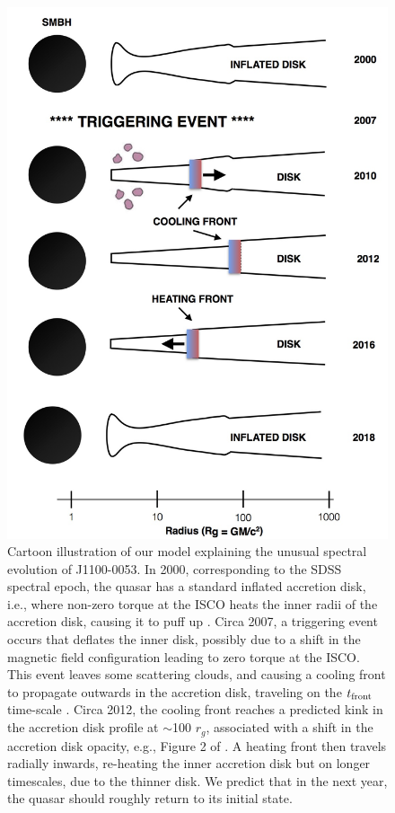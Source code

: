 \documentclass[a4paper,fleqn,usenatbib]{mnras}
\begin{document}
\begin{figure}
  \includegraphics[width=15.4cm, trim=0.0cm 0.0cm 0.0cm 0.0cm, clip]
  {../plots/models/cartoon_v3pnt1.jpg}
  \centering
  \caption[]{
    Cartoon illustration of our model explaining the unusual spectral
evolution of J1100-0053. In 2000, corresponding to the SDSS spectral
epoch, the quasar has a standard inflated accretion disk, i.e., where
non-zero torque at the ISCO heats the inner radii of the accretion
disk, causing it to puff up \citep[e.g.,][]{Zimmerman2005}. Circa
2007, a triggering event occurs that deflates the inner disk, possibly
due to a shift in the magnetic field configuration leading to zero
torque at the ISCO.  This event leaves some scattering clouds, and
causing a cooling front to propagate outwards in the accretion disk,
traveling on the $t_{\rm front}$ time-scale 
\citep[see also][]{Hameury2009}. 
 Circa 2012, the cooling
front reaches a predicted kink in the accretion disk profile at
$\sim$100 $r_{g}$, associated with a shift in the accretion disk
opacity, e.g., Figure 2 of \cite{Sirko_Goodman2003}. A heating front
then travels radially inwards, re-heating the inner accretion disk but
on longer timescales, due to the thinner disk. We predict that in the
next year, the quasar should roughly return to its initial state.}
  \label{fig:J110057_diskmodel}
\end{figure}
\end{document}
